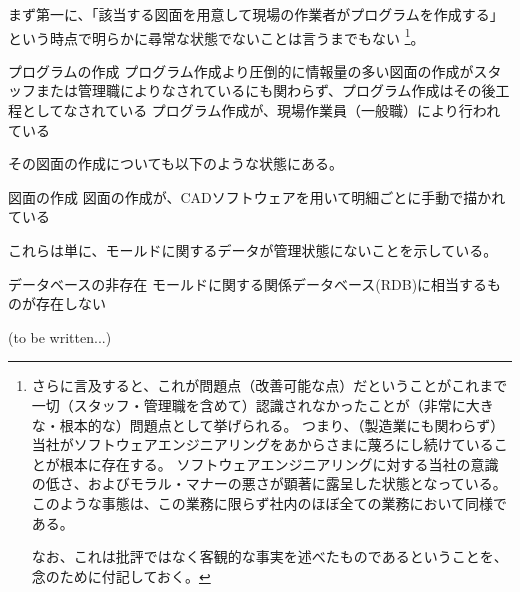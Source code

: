 まず第一に、「該当する図面を用意して現場の作業者がプログラムを作成する」という時点で明らかに尋常な状態でないことは言うまでもない
\footnote{さらに言及すると、これが問題点（改善可能な点）だということがこれまで一切（スタッフ・管理職を含めて）認識されなかったことが（非常に大きな・根本的な）問題点として挙げられる。
つまり、（製造業にも関わらず）当社がソフトウェアエンジニアリングをあからさまに蔑ろにし続けていることが根本に存在する。
ソフトウェアエンジニアリングに対する当社の意識の低さ、およびモラル・マナーの悪さが顕著に露呈した状態となっている。
このような事態は、この業務に限らず社内のほぼ全ての業務において同様である。

なお、これは批評ではなく客観的な事実を述べたものであるということを、念のために付記しておく。}。
\begin{Issues}{プログラムの作成}
プログラム作成より圧倒的に情報量の多い図面の作成がスタッフまたは管理職によりなされているにも関わらず、プログラム作成はその後工程としてなされている
\tcbline*
プログラム作成が、現場作業員（一般職）により行われている
\end{Issues}
その図面の作成についても以下のような状態にある。
\begin{Issues}{図面の作成}
図面の作成が、CADソフトウェアを用いて明細ごとに手動で描かれている
\end{Issues}
これらは単に、モールドに関するデータが管理状態にないことを示している。
\begin{Issues}{データベースの非存在}
モールドに関する関係データベース(RDB)に相当するものが存在しない
\end{Issues}



\clearpage
\modHeadsection{\TBW}
(to be written...)







